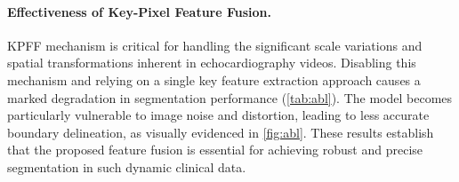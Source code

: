 \paragraph{Effectiveness of Key-Pixel Feature Fusion.}
\begin{sloppypar}
KPFF mechanism is critical for handling the significant scale variations and spatial transformations inherent in echocardiography videos. Disabling this mechanism and relying on a single key feature extraction approach causes a marked degradation in segmentation performance (\cref{tab:abl}). The model becomes particularly vulnerable to image noise and distortion, leading to less accurate boundary delineation, as visually evidenced in \cref{fig:abl}. These results establish that the proposed feature fusion is essential for achieving robust and precise segmentation in such dynamic clinical data.
\end{sloppypar}
